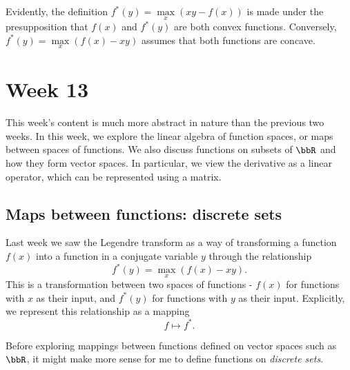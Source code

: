 \documentclass[a4paper, 12pt,oneside,openany]{book}
\begin{document}
Evidently, the definition $f^*(y) = \max\limits_x (xy-f(x))$ is made under the presupposition that $f(x)$ and $f^*(y)$ are both convex functions. Conversely, $f^*(y) = \max\limits_x (f(x)-xy)$ assumes that both functions are concave.


\chapter{Week 13}

This week's content is much more abstract in nature than the previous two weeks. In this week, we explore the linear algebra of function spaces, or maps between spaces of functions. We also discuss functions on subsets of $\bbR$ and how they form vector spaces. In particular, we view the derivative as a linear operator, which can be represented using a matrix. 

\section{Maps between functions: discrete sets}

Last week we saw the Legendre transform as a way of transforming a function $f(x)$ into a function in a conjugate variable $y$ through the relationship $$f^*(y) = \max\limits_x (f(x)-xy).$$ This is a transformation between two spaces of functions - $f(x)$ for functions with $x$ as their input, and $f^*(y)$ for functions with $y$ as their input. Explicitly, we represent this relationship as a mapping $$f \mapsto f^*.$$

Before exploring mappings between functions defined on vector spaces such as $\bbR$, it might make more sense for me to define functions on \emph{discrete sets}. 

\end{document}
